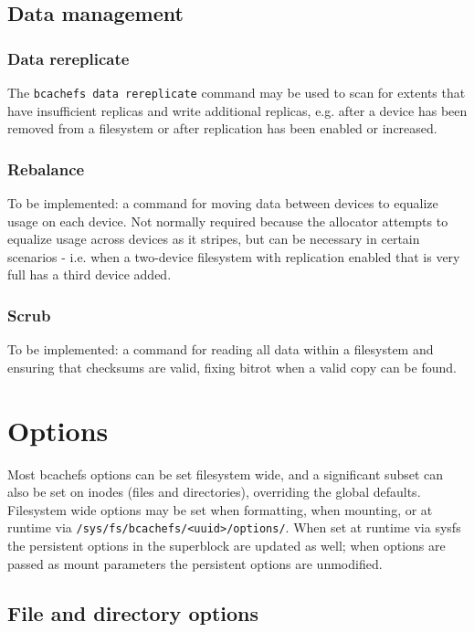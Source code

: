 \documentclass{article}
\begin{document}
\subsection{Data management}

\subsubsection{Data rereplicate}

The \texttt{bcachefs data rereplicate} command may be used to scan for extents
that have insufficient replicas and write additional replicas, e.g. after a
device has been removed from a filesystem or after replication has been enabled
or increased.

\subsubsection{Rebalance}

To be implemented: a command for moving data between devices to equalize usage
on each device. Not normally required because the allocator attempts to equalize
usage across devices as it stripes, but can be necessary in certain scenarios -
i.e. when a two-device filesystem with replication enabled that is very full has
a third device added.

\subsubsection{Scrub}

To be implemented: a command for reading all data within a filesystem and
ensuring that checksums are valid, fixing bitrot when a valid copy can be found.

\section{Options}

Most bcachefs options can be set filesystem wide, and a significant subset can
also be set on inodes (files and directories), overriding the global defaults.
Filesystem wide options may be set when formatting, when mounting, or at runtime
via \texttt{/sys/fs/bcachefs/<uuid>/options/}. When set at runtime via sysfs the
persistent options in the superblock are updated as well; when options are
passed as mount parameters the persistent options are unmodified.

\subsection{File and directory options}
\end{document}
